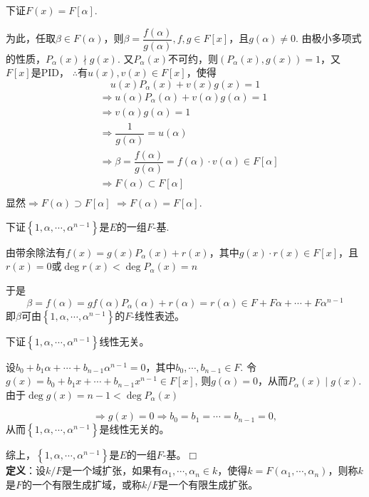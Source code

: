\documentclass[UTF8]{article}
\begin{document}
下证$F(x)=F[\alpha]$.

为此，任取$\beta\in F(\alpha)$，则$\beta=\dfrac{f(\alpha)}{g(\alpha)}, f,g\in F[x]$，且$g(\alpha)\neq 0$.
由极小多项式的性质，$P_{\alpha}(x)\nmid g(x)$.
又$P_{\alpha}(x)$不可约，则$\left( P_{\alpha}(x), g(x)\right)=1$，又$F[x]$是PID，
$\therefore$有$u(x), v(x)\in F[x]$，使得
$$
u(x)P_{\alpha}(x)+v(x)g(x)=1
$$
\[
\begin{split}
&\Rightarrow u(\alpha)P_{\alpha}(\alpha)+v(\alpha)g(\alpha)=1\\
&\Rightarrow v(\alpha)g(\alpha)=1\\
& \Rightarrow\dfrac{1}{g(\alpha)}=u(\alpha)\\
& \Rightarrow\beta=\dfrac{f(\alpha)}{g(\alpha)}=f(\alpha)\cdot v(\alpha)\in F[\alpha]\\
& \Rightarrow F(\alpha)\subset F[\alpha]\\
\end{split}
\]
\quad 显然$\Rightarrow F(\alpha)\supset  F[\alpha]$
$\Rightarrow F(\alpha)=F[\alpha]$.

\quad

下证$\left\{ 1,\alpha,\cdots, \alpha^{n-1}\right\}$是$E$的一组$F$-基.

由带余除法有$f(x)=g(x)P_{\alpha}(x)+r(x)$，其中$g(x)\cdot r(x)\in F[x]$，且$r(x)=0$或$\operatorname{deg}r(x)<\operatorname{deg}P_{\alpha}(x)=n$

于是
$$
\beta=f(\alpha)=gf(\alpha)P_{\alpha}(\alpha)+r(\alpha)=r(\alpha)\in F+F\alpha+\cdots +F\alpha^{n-1}
$$
即$\beta$可由$\left\{ 1,\alpha,\cdots, \alpha^{n-1}\right\}$的$F$-线性表述。

下证$\left\{ 1,\alpha,\cdots, \alpha^{n-1}\right\}$线性无关。

设$b_0+b_1\alpha+\cdots +b_{n-1}\alpha^{n-1}=0$，其中$b_0,\cdots,b_{n-1}\in F$.
令$g(x)=b_0+b_1x+\cdots +b_{n-1}x^{n-1}\in F[x]$,
则$g(\alpha)=0$，从而$P_{\alpha}(x) \mid g(x)$.
由于$\operatorname{deg}g(x)=n-1<\operatorname{deg}P_{\alpha}(x)$

$$\Rightarrow g(x)=0\Rightarrow b_0=b_1=\cdots=b_{n-1}=0,$$
从而$\left\{ 1,\alpha,\cdots, \alpha^{n-1}\right\}$是线性无关的。

综上，$\left\{ 1,\alpha,\cdots, \alpha^{n-1}\right\}$是$E$的一组$F$-基。\hfill$\Box$\\


\textbf{定义}：设$k/F$是一个域扩张，如果有$\alpha_1,\cdots,\alpha_n\in k$，使得$k=F\left( \alpha_1,\cdots,\alpha_n\right)$，则称$k$是$F$的一个有限生成扩域，或称$k/F$是一个有限生成扩张。
\end{document}
